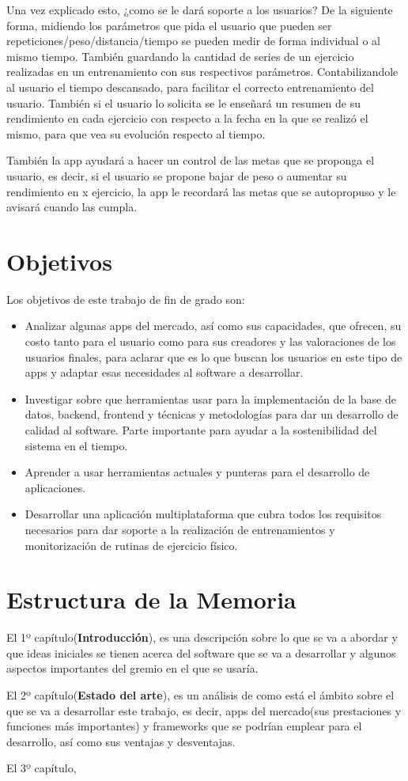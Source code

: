 Una vez explicado esto, ¿como se le dará soporte a los usuarios? De la siguiente forma, midiendo los parámetros que pida el usuario que pueden ser repeticiones/peso/distancia/tiempo se pueden medir de forma individual o al mismo tiempo. También guardando la cantidad de series de un ejercicio realizadas en un entrenamiento con sus respectivos parámetros. Contabilizandole al usuario el tiempo descansado, para facilitar el correcto entrenamiento del usuario. También si el usuario lo solicita se le enseñará un resumen de su rendimiento en cada ejercicio con respecto a la fecha en la que se realizó el mismo, para que vea su evolución respecto al tiempo. 

También la app ayudará a hacer un control de las metas que se proponga el usuario, es decir, si el usuario se propone bajar de peso o aumentar su rendimiento en x ejercicio, la app le recordará las metas que se autopropuso y le avisará cuando las cumpla. 

\section{Objetivos}
Los objetivos de este trabajo de fin de grado son:

\begin{itemize}
	\item Analizar algunas apps del mercado, así como sus capacidades, que ofrecen, su costo tanto para el usuario como para sus creadores y las valoraciones de los usuarios finales, para aclarar que es lo que buscan los usuarios en este tipo de apps y adaptar esas necesidades al software a desarrollar.
	\item Investigar sobre que herramientas usar para la implementación de la base de datos, backend, frontend y técnicas y metodologías para dar un desarrollo de calidad al software. Parte importante para ayudar a la sostenibilidad del sistema en el tiempo.
	\item Aprender a usar herramientas actuales y punteras para el desarrollo de aplicaciones.
	\item Desarrollar una aplicación multiplataforma que cubra todos los requisitos necesarios para dar soporte a la realización de entrenamientos y monitorización de rutinas de ejercicio físico.
\end{itemize}

\section{Estructura de la Memoria}

El 1º capítulo(\textbf{Introducción}), es una descripción sobre lo que se va a abordar y que ideas iniciales se tienen acerca del software que se va a desarrollar y algunos aspectos importantes del gremio en el que se usaría.

El 2º capítulo(\textbf{Estado del arte}), es un análisis de como está el ámbito sobre el que se va a desarrollar este trabajo, es decir, apps del mercado(sus prestaciones y funciones más importantes) y frameworks que se podrían emplear para el desarrollo, así como sus ventajas y desventajas.

El 3º capítulo,